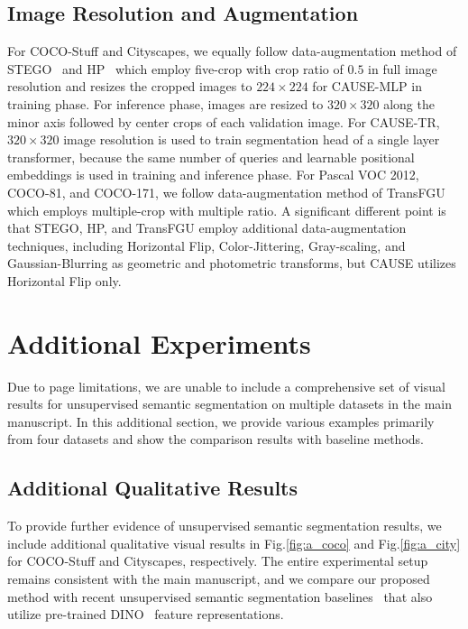 \documentclass{article} \usepackage{iclr2024_conference,times}
\begin{document}
\subsection{Image Resolution and Augmentation}
For COCO-Stuff and Cityscapes, we equally follow data-augmentation method of STEGO~\citep{hamilton2022unsupervised} and HP~\citep{seong2023leveraging} which employ five-crop with crop ratio of $0.5$ in full image resolution and resizes the cropped images to $224\times 224$ for CAUSE-MLP in training phase. For inference phase, images are resized to $320\times 320$ along the minor axis followed by center crops of each validation image. For CAUSE-TR, $320\times 320$ image resolution is used to train segmentation head of a single layer transformer, because the same number of queries and learnable positional embeddings is used in training and inference phase. For Pascal VOC 2012, COCO-81, and COCO-171, we follow data-augmentation method of TransFGU~\citep{yin2022transfgu} which employs multiple-crop with multiple ratio. A significant different point is that STEGO, HP, and TransFGU employ additional data-augmentation techniques, including Horizontal Flip, Color-Jittering, Gray-scaling, and Gaussian-Blurring as geometric and photometric transforms, but CAUSE utilizes Horizontal Flip only.

\section{Additional Experiments}
\label{appendix:C}
Due to page limitations, we are unable to include a comprehensive set of visual results for unsupervised semantic segmentation on multiple datasets in the main manuscript. In this additional section, we provide various examples primarily from four datasets and show the comparison results with baseline methods.


\subsection{Additional Qualitative Results}
To provide further evidence of unsupervised semantic segmentation results, we include additional qualitative visual results in Fig.\ref{fig:a_coco} and Fig.\ref{fig:a_city} for COCO-Stuff and Cityscapes, respectively. The entire experimental setup remains consistent with the main manuscript, and we compare our proposed method with recent unsupervised semantic segmentation baselines~\citep{hamilton2022unsupervised, seong2023leveraging, shin2022reco} that also utilize pre-trained DINO~\citep{caron2021emerging} feature representations.
\end{document}
